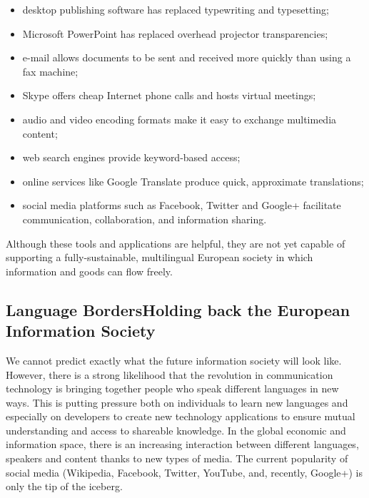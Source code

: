\begin{multicols}{2}
\begin{itemize}
\item desktop publishing software has replaced typewriting and typesetting;
\item Microsoft PowerPoint has replaced overhead projector transparencies;
\item e-mail allows documents to be sent and received more quickly than using a fax machine;
\item Skype offers cheap Internet phone calls and hosts virtual meetings;
\item audio and video encoding formats make it easy to exchange multimedia content;
\item web search engines provide keyword-based access;
\item online services like Google Translate produce quick, approximate translations;
\item social media platforms such as Facebook, Twitter and Google+ facilitate communication, collaboration, and information sharing.
\end{itemize}

Although these tools and applications are helpful, they are not yet capable of supporting a fully-sustainable, multilingual European society in which information and goods can flow freely.

\subsection[Language Borders Holding back the European Information Society]{Language Borders\newline Holding back the European Information Society}

We cannot predict exactly what the future information society will look like. However, there is a strong likelihood that the revolution in communication technology is bringing together people who speak different languages in new ways. This is putting pressure both on individuals to learn new languages and especially on developers to create new technology applications to ensure mutual understanding and access to shareable knowledge. In the global economic and information space, there is an increasing interaction between different languages, speakers and content thanks to new types of media. The current popularity of social media (Wikipedia, Facebook, Twitter, YouTube, and, recently, Google+) is only the tip of the iceberg.



\end{multicols}
